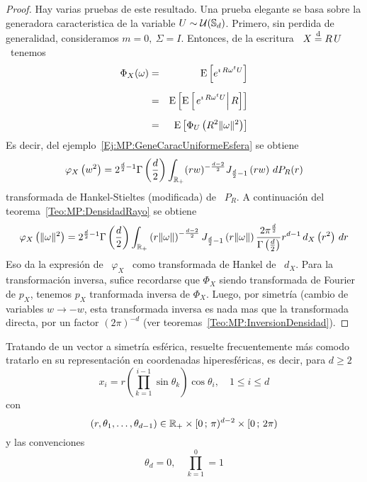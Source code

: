 \begin{proof}
  Hay varias  pruebas de este  resultado. Una prueba  elegante se basa  sobre la
  generadora caracteristica  de la variable $U \sim  \mathcal{U}(\mathbb{S}_d)$.  Primero, sin
  perdida de generalidad,  consideramos $m = 0, \: \Sigma =  I$. Entonces, de la
  escritura \ $X \stackrel{\mathrm{d}}{=} R \, U$ \ tenemos
  \begin{eqnarray*}
  \Phi_X(\omega) & = & \operatorname{E}\left[ e^{\imath \, R \omega^t U} \right]\\[2mm]
  & = & \operatorname{E}\left[ \operatorname{E}\left[ \left. e^{\imath \, R \omega^t U} \right| R \right]
  \right]\\[2mm]
  & = & \operatorname{E}\left[ \Phi_U\left( R^2 \| \omega \|^2 \right)  \right]
  \end{eqnarray*}
  Es    decir,    del    ejemplo~\ref{Ej:MP:GeneCaracUniformeEsfera} se obtiene
  \[
  \varphi_X\left(  w^2  \right)  =  2^{\frac{d}{2}-1}  \Gamma\left(
    \frac{d}{2}  \right)  \int_{\mathbb{R}_+}  (r w)^{-
    \frac{d-2}{2}}  J_{\frac{d}{2}-1}  \left( r  w \right)  \, dP_R(r)
  \]
  transformada de Hankel-Stieltes (modificada)  de \ $P_R$. A continuaci\'on del
  teorema~\ref{Teo:MP:DensidadRayo} se obtiene
  \[
  \varphi_X\left(  \|  \omega  \|^2  \right)  =  2^{\frac{d}{2}-1}  \Gamma\left(
    \frac{d}{2}  \right)  \int_{\mathbb{R}_+}  \left(   r  \|  \omega  \|  \right)^{-
    \frac{d-2}{2}}  J_{\frac{d}{2}-1}  \left( r  \|  \omega  \| \right)  \frac{2
    \pi^{\frac{d}{2}}}{\Gamma\left(  \frac{d}{2} \right)}  r^{d-1}  \, d_X\left(
    r^2 \right) \, dr
  \]
  Eso da  la expresi\'on  de \ $\varphi_X$  \ como  transformada de Hankel  de \
  $d_X$. Para la transformaci\'on inversa, sufice recordarse que $\Phi_X$ siendo
  transformada  de  Fourier  de  $p_X$,  tenemos $p_X$  tranformada  inversa  de
  $\Phi_X$.  Luego,  por  simetr\'ia  (cambio  de variables  $w  \to  -w$,  esta
  transformada inversa  es nada mas que  la transformada directa,  por un factor
  $(2 \pi)^{-d}$ (ver teoremas~\ref{Teo:MP:InversionDensidad}).
\end{proof}

Tratando  de un vector  a simetr\'ia  esf\'erica, resuelte  frecuentemente m\'as
comodo  tratarlo  en su  representaci\'on  en  coordenadas hiperesf\'ericas,  es
decir, para $d \ge 2$
%
\[
x_i = r \left( \prod_{k=1}^{i-1} \sin\theta_k \right) \cos \theta_i, \quad 1 \le
i \le d
\]
%
con
%
\[
(r,\theta_1,\ldots,\theta_{d-1}) \in \mathbb{R}_+ \times [0 \, ; \, \pi)^{d-2} \times [0 \, ; \, 2 \pi)
\]
%
y las convenciones
%
\[
\theta_d = 0, \quad \prod_{k=1}^{0} = 1
\]

